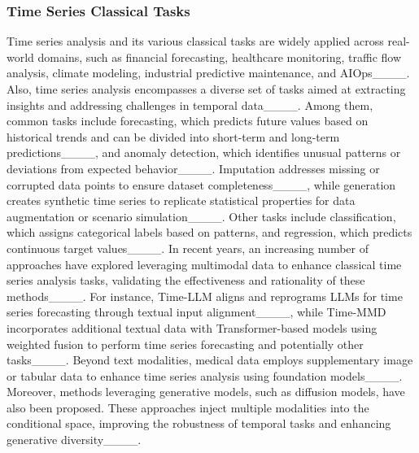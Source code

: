 \subsubsection{Time Series Classical Tasks}
Time series analysis and its various classical tasks are widely applied across real-world domains, such as financial forecasting, healthcare monitoring, traffic flow analysis, climate modeling, industrial predictive maintenance, and AIOps____. Also, time series analysis encompasses a diverse set of tasks aimed at extracting insights and addressing challenges in temporal data____. Among them, common tasks include forecasting, which predicts future values based on historical trends and can be divided into short-term and long-term predictions____, and anomaly detection, which identifies unusual patterns or deviations from expected behavior____. Imputation addresses missing or corrupted data points to ensure dataset completeness____, while generation creates synthetic time series to replicate statistical properties for data augmentation or scenario simulation____. Other tasks include classification, which assigns categorical labels based on patterns, and regression, which predicts continuous target values____. In recent years, an increasing number of approaches have explored leveraging multimodal data to enhance classical time series analysis tasks, validating the effectiveness and rationality of these methods____. For instance, Time-LLM aligns and reprograms LLMs for time series forecasting through textual input alignment____, while Time-MMD incorporates additional textual data with Transformer-based models using weighted fusion to perform time series forecasting and potentially other tasks____. Beyond text modalities, medical data employs supplementary image or tabular data to enhance time series analysis using foundation models____. Moreover, methods leveraging generative models, such as diffusion models, have also been proposed. These approaches inject multiple modalities into the conditional space, improving the robustness of temporal tasks and enhancing generative diversity____.

